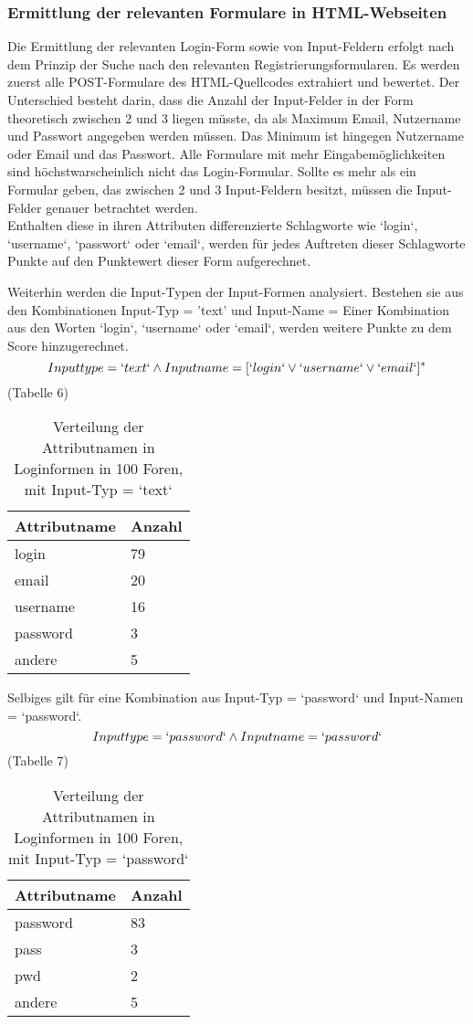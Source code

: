 \subsubsection{Ermittlung der relevanten Formulare in HTML-Webseiten}
Die Ermittlung der relevanten Login-Form sowie von Input-Feldern erfolgt nach dem Prinzip der Suche nach den relevanten Registrierungsformularen. Es werden zuerst alle POST-Formulare des HTML-Quellcodes extrahiert und bewertet. Der Unterschied besteht darin, dass die Anzahl der Input-Felder in der Form theoretisch zwischen 2 und 3 liegen müsste, da als Maximum Email, Nutzername und Passwort angegeben werden müssen. Das Minimum ist hingegen Nutzername oder Email und das Passwort. Alle Formulare mit mehr Eingabemöglichkeiten sind höchstwarscheinlich nicht das Login-Formular.
Sollte es mehr als ein Formular geben, das zwischen 2 und 3 Input-Feldern besitzt, müssen die Input-Felder genauer betrachtet werden. \\
Enthalten diese in ihren Attributen differenzierte Schlagworte wie `login`, `username`, `passwort` oder `email`, werden für jedes Auftreten dieser Schlagworte Punkte auf den Punktewert dieser Form aufgerechnet.


Weiterhin werden die Input-Typen der Input-Formen analysiert. Bestehen sie aus den Kombinationen Input-Typ = 'text' und Input-Name = Einer Kombination aus den Worten `login`, `username` oder `email`, werden weitere Punkte zu dem Score hinzugerechnet.
\[Inputtype = `text` \wedge Inputname = [`login` \vee `username` \vee `email`]^*\] (Tabelle 6)

\begin{table}[h!]
\centering 
\begin{tabular}{ | p{3cm} | p{3cm}|} \hline
Attributname & Anzahl \\ \hline
login & 79 \\ \hline
email & 20 \\ \hline
username & 16 \\ \hline
password & 3 \\ \hline
andere & 5 \\ \hline
\end{tabular}
\caption{Verteilung der Attributnamen in Loginformen in 100 Foren, mit Input-Typ = `text`}
\end{table}



Selbiges gilt für eine Kombination aus Input-Typ = `password` und Input-Namen = `password`.
\[Inputtype = `password` \wedge Inputname = `password`\] (Tabelle 7)
\newpage
\begin{table}[h!]
\centering 
\begin{tabular}{ | p{3cm} | p{3cm}|} \hline
Attributname & Anzahl \\ \hline
password & 83 \\ \hline
pass & 3 \\ \hline
pwd & 2 \\ \hline
andere & 5 \\ \hline
\end{tabular}
\caption{Verteilung der Attributnamen in Loginformen in 100 Foren, mit Input-Typ = `password`}
\end{table}


